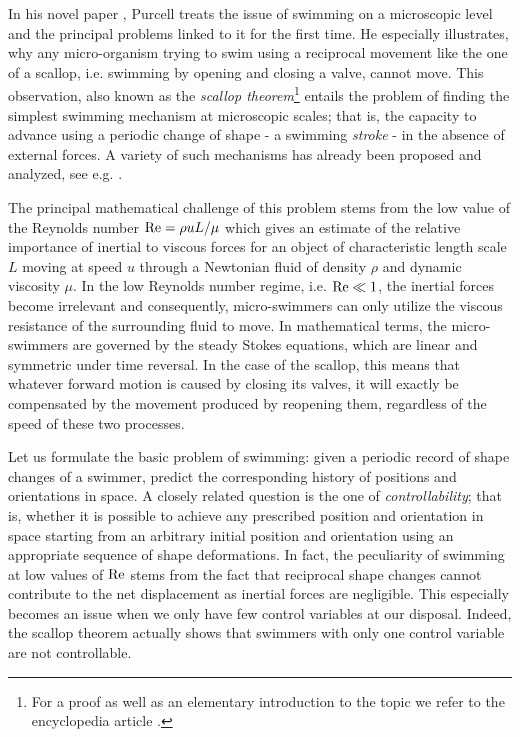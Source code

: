 
In his novel paper \cite{Purcell1977}, Purcell treats the issue of swimming on a microscopic level and the principal problems linked to it for the first time. He especially illustrates, why any micro-organism trying to swim using a reciprocal movement like the one of a scallop, i.e. swimming by opening and closing a valve, cannot move. This observation, also known as the \emph{scallop theorem}\footnote{For a proof as well as an elementary introduction to the topic we refer to the encyclopedia article \cite{DeSimone2011}.} entails the problem of finding the simplest swimming mechanism at microscopic scales; that is, the capacity to advance using a periodic change of  shape - a swimming \emph{stroke} - in  the absence of external forces. A variety of such mechanisms has already been proposed and analyzed, see e.g. \cite{Alouges2013, Najafi2004, Purcell1977}.


The principal mathematical challenge of this problem stems from the low value of the Reynolds number $\operatorname{Re} = \rho u L/\mu$ which gives an estimate of the relative importance of inertial to viscous forces for an object of characteristic length scale $L$ moving at speed $u$ through a Newtonian fluid of density $\rho$ and dynamic viscosity $\mu$. In the low Reynolds number regime, i.e. $\operatorname{Re} \ll 1$, the inertial forces become irrelevant and consequently, micro-swimmers can only utilize the viscous resistance of the surrounding fluid to move. In mathematical terms, the micro-swimmers are governed by the steady Stokes equations, which are linear and symmetric under time reversal. In the case of the scallop, this means that whatever forward motion is caused by closing its valves, it will exactly be compensated by the movement produced by reopening them, regardless of the speed of these two processes.

Let us formulate the basic problem of swimming: given a periodic record of shape changes of a swimmer, predict the corresponding history of positions and orientations in space. A closely related question is the one of \emph{controllability}; that is, whether it is possible to achieve any prescribed position and orientation in space starting from an arbitrary initial position and orientation using an appropriate sequence of shape deformations. In fact, the peculiarity of swimming at low values of $\operatorname{Re}$ stems from the fact that reciprocal shape changes cannot contribute to the net displacement as inertial forces are negligible. This especially becomes an issue when we only have few control variables at our disposal. Indeed, the scallop theorem actually shows that swimmers with only one control variable are not controllable.

